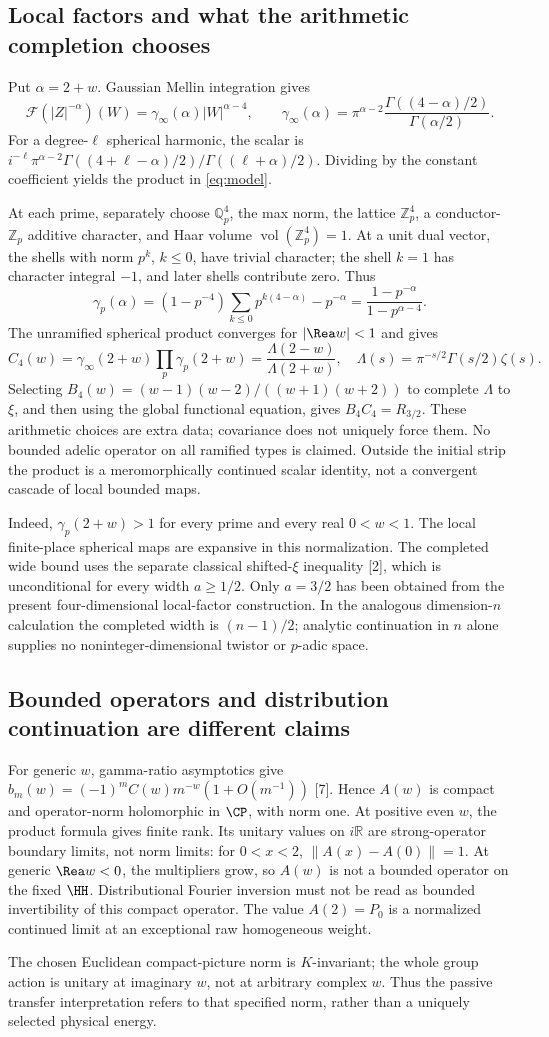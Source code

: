 \subsection*{Local factors and what the arithmetic completion chooses}
Put $\alpha=2+w$. Gaussian Mellin integration gives
\[
 \mathcal F(|Z|^{-\alpha})(W)=\gamma_\infty(\alpha)|W|^{\alpha-4},\qquad
 \gamma_\infty(\alpha)=\pi^{\alpha-2}\frac{\Gamma((4-\alpha)/2)}{\Gamma(\alpha/2)}.
\]
For a degree-$\ell$ spherical harmonic, the scalar is
$i^{-\ell}\pi^{\alpha-2}\Gamma((4+\ell-\alpha)/2)/\Gamma((\ell+\alpha)/2)$.
Dividing by the constant coefficient yields the product in \eqref{eq:model}.

At each prime, separately choose $\mathbb Q_p^4$, the max norm, the lattice $\mathbb Z_p^4$, a conductor-$\mathbb Z_p$ additive character, and Haar volume $\operatorname{vol}(\mathbb Z_p^4)=1$. At a unit dual vector, the shells with norm $p^k$, $k\leq0$, have trivial character; the shell $k=1$ has character integral $-1$, and later shells contribute zero. Thus
\[
 \gamma_p(\alpha)=(1-p^{-4})\sum_{k\leq0}p^{k(4-\alpha)}-p^{-\alpha}
 =\frac{1-p^{-\alpha}}{1-p^{\alpha-4}}.
\]
The unramified spherical product converges for $|\Rea w|<1$ and gives
\[
 C_4(w)=\gamma_\infty(2+w)\prod_p\gamma_p(2+w)
 =\frac{\Lambda(2-w)}{\Lambda(2+w)},\quad
 \Lambda(s)=\pi^{-s/2}\Gamma(s/2)\zeta(s).
\]
Selecting $B_4(w)=(w-1)(w-2)/((w+1)(w+2))$ to complete $\Lambda$ to $\xi$, and then using the global functional equation, gives $B_4C_4=R_{3/2}$. These arithmetic choices are extra data; covariance does not uniquely force them. No bounded adelic operator on all ramified types is claimed. Outside the initial strip the product is a meromorphically continued scalar identity, not a convergent cascade of local bounded maps.

Indeed, $\gamma_p(2+w)>1$ for every prime and every real $0<w<1$. The local finite-place spherical maps are expansive in this normalization. The completed wide bound uses the separate classical shifted-$\xi$ inequality [2], which is unconditional for every width $a\geq1/2$. Only $a=3/2$ has been obtained from the present four-dimensional local-factor construction. In the analogous dimension-$n$ calculation the completed width is $(n-1)/2$; analytic continuation in $n$ alone supplies no noninteger-dimensional twistor or $p$-adic space.

\subsection*{Bounded operators and distribution continuation are different claims}
For generic $w$, gamma-ratio asymptotics give
$b_m(w)=(-1)^m C(w)m^{-w}(1+O(m^{-1}))$ [7]. Hence $A(w)$ is compact and operator-norm holomorphic in $\CP$, with norm one. At positive even $w$, the product formula gives finite rank. Its unitary values on $i\mathbb R$ are strong-operator boundary limits, not norm limits: for $0<x<2$, $\|A(x)-A(0)\|=1$. At generic $\Rea w<0$, the multipliers grow, so $A(w)$ is not a bounded operator on the fixed $\HH$. Distributional Fourier inversion must not be read as bounded invertibility of this compact operator. The value $A(2)=P_0$ is a normalized continued limit at an exceptional raw homogeneous weight.

The chosen Euclidean compact-picture norm is $K$-invariant; the whole group action is unitary at imaginary $w$, not at arbitrary complex $w$. Thus the passive transfer interpretation refers to that specified norm, rather than a uniquely selected physical energy.
